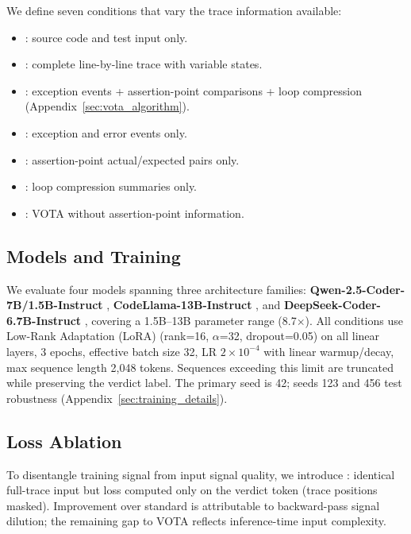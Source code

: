 We define seven conditions that vary the trace information available:
\begin{itemize}[nosep,leftmargin=1em]
\item {}: source code and test input only.
\item {}: complete line-by-line trace with variable states.
\item {}: exception events + assertion-point comparisons + loop compression (Appendix~\ref{sec:vota_algorithm}).
\item {}: exception and error events only.
\item {}: assertion-point actual/expected pairs only.
\item {}: loop compression summaries only.
\item {}: VOTA without assertion-point information.
\end{itemize}

\subsection{Models and Training}

We evaluate four models spanning three architecture families: \textbf{Qwen-2.5-Coder-7B/1.5B-Instruct} \citep{qwen2025coder}, \textbf{CodeLlama-13B-Instruct} \citep{roziere2024code}, and \textbf{DeepSeek-Coder-6.7B-Instruct} \citep{deepseek2024coder}, covering a 1.5B--13B parameter range (8.7$\times$).
All conditions use Low-Rank Adaptation (LoRA) \citep{hu2022lora} (rank=16, $\alpha$=32, dropout=0.05) on all linear layers, 3 epochs, effective batch size 32, LR $2 \times 10^{-4}$ with linear warmup/decay, max sequence length 2{,}048 tokens.
Sequences exceeding this limit are truncated while preserving the verdict label.
The primary seed is 42; seeds 123 and 456 test  robustness (Appendix~\ref{sec:training_details}).

\subsection{Loss Ablation}

To disentangle training signal from input signal quality, we introduce : identical full-trace input but loss computed only on the verdict token (trace positions masked).
Improvement over standard  is attributable to backward-pass signal dilution; the remaining gap to VOTA reflects inference-time input complexity.

